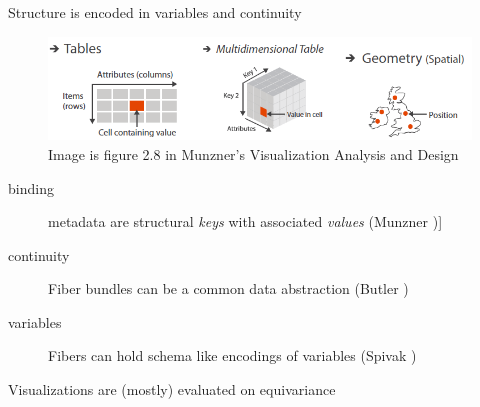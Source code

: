 \documentclass[xcolor={dvipsnames}, handout]{beamer}
\begin{document}
\begin{frame}{Structure is encoded in variables and continuity}
    \begin{figure}
        \includegraphics[width=1\textwidth]{figures/intro/munzner_datatypes.png}
        \caption{Image is figure 2.8 in Munzner's Visualization Analysis and Design\cite{munznerVisualizationAnalysisDesign2014}}
    \end{figure}
    \begin{description}
        \item[binding] metadata are structural \textit{keys} with associated \textit{values} (Munzner \cite{munznerVisualizationAnalysisDesign2014})] 
        \item[continuity] Fiber bundles can be a common data abstraction (Butler \cite{butlerVectorBundleClassesForm1992,butlerVisualizationModelBased1989})
        \item[variables] Fibers can hold schema like encodings of variables (Spivak \cite{spivakDatabasesAreCategories2010,spivakSIMPLICIALDATABASES})
    \end{description}
\end{frame}

\begin{frame}{Visualizations are (mostly) evaluated on equivariance}
\end{frame}
\end{document}

